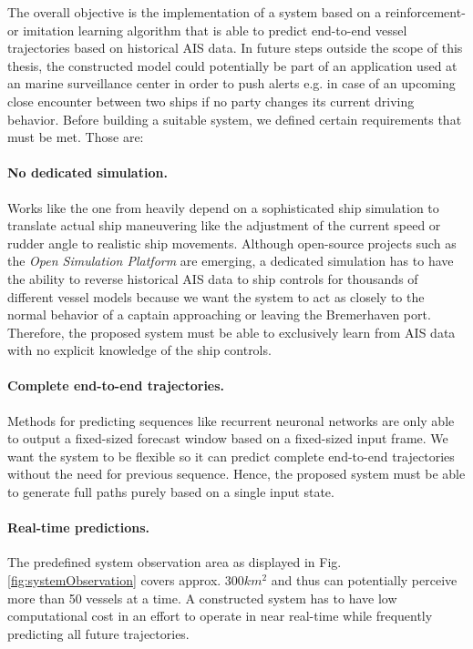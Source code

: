 The overall objective is the implementation of a system based on a reinforcement- or imitation learning algorithm that is able to predict end-to-end vessel trajectories based on historical AIS data. In future steps outside the scope of this thesis, the constructed model could potentially be part of an application used at an marine surveillance center in order to push alerts e.g. in case of an upcoming close encounter between two ships if no party changes its current driving behavior. Before building a suitable system, we defined certain requirements that must be met. Those are:
\paragraph{No dedicated simulation.} Works like the one from \cite{westerlund2021learning} heavily depend on a sophisticated ship simulation to translate actual ship maneuvering like the adjustment of the current speed or rudder angle to realistic ship movements. Although open-source projects such as the \textit{Open Simulation Platform} \cite[]{smogeli2020open} are emerging, a dedicated simulation has to have the ability to reverse historical AIS data to ship controls for thousands of different vessel models because we want the system to act as closely to the normal behavior of a captain approaching or leaving the Bremerhaven port. Therefore, the proposed system must be able to exclusively learn from AIS data with no explicit knowledge of the ship controls.

\paragraph{Complete end-to-end trajectories.}
Methods for predicting sequences like recurrent neuronal networks are only able to output a fixed-sized forecast window based on a fixed-sized input frame. We want the system to be flexible so it can predict complete end-to-end trajectories without the need for previous sequence. Hence, the proposed system must be able to generate full paths purely based on a single input state.

\paragraph{Real-time predictions.} The predefined system observation area as displayed in Fig. \ref{fig:systemObservation} covers approx. $300 km^2$ and thus can potentially perceive more than 50 vessels at a time. A constructed system has to have low computational cost in an effort to operate in near real-time while frequently predicting all future trajectories.


